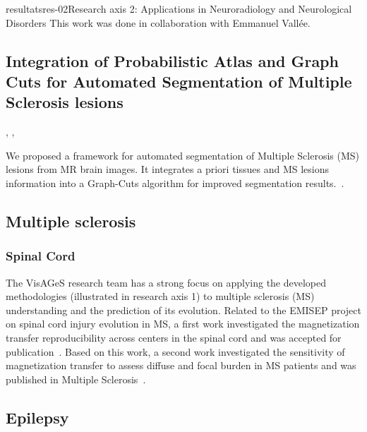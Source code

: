 \documentclass{ra2018}
\begin{document}
\begin{module}{resultats}{res-02}{Research axis 2: Applications in Neuroradiology and Neurological Disorders}
This work was done in collaboration with Emmanuel Vallée. 

\subsection{Integration of Probabilistic Atlas and Graph Cuts for Automated Segmentation of Multiple Sclerosis lesions}
\begin{participants}
      ,
      ,
\end{participants}
We proposed a framework for automated segmentation of Multiple Sclerosis (MS) lesions
from MR brain images. It integrates a priori tissues and MS lesions information into a Graph-Cuts algorithm for improved segmentation results.~\cite{galassi:hal-01823801}.

\subsection{Multiple sclerosis}

\subsubsection{Spinal Cord}
\begin{participants}
\end{participants}
The VisAGeS research team has a strong focus on applying the developed methodologies (illustrated in research axis 1) to multiple sclerosis (MS) understanding and the prediction of its evolution. Related to the EMISEP project on spinal cord injury evolution in MS, a first work investigated the magnetization transfer reproducibility across centers in the spinal cord and was accepted for publication~\cite{combes:hal-01934605}. Based on this work, a second work investigated the sensitivity of magnetization transfer to assess diffuse and focal burden in MS patients and was published in Multiple Sclerosis~\cite{combes:hal-01934621}.

\subsection{Epilepsy}
\begin{participants}
\end{participants}


\end{module}
\end{document}
